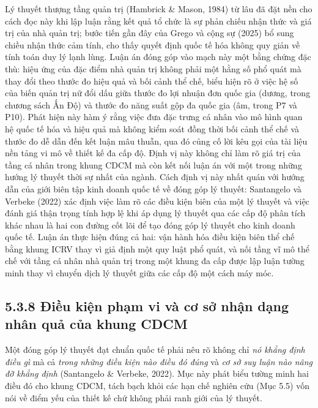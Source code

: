 \documentclass[
  a4paper,
  13pt]{extreport}
\begin{document}
Lý thuyết thượng tầng quản trị (Hambrick \& Mason, 1984) từ lâu đã đặt
nền cho cách đọc này khi lập luận rằng kết quả tổ chức là sự phản chiếu
nhận thức và giá trị của nhà quản trị; bước tiến gần đây của Grego và
cộng sự (2025) bổ sung chiều nhận thức cảm tính, cho thấy quyết định
quốc tế hóa không quy giản về tính toán duy lý lạnh lùng. Luận án đóng
góp vào mạch này một bằng chứng đặc thù: hiệu ứng của đặc điểm nhà quản
trị không phải một hằng số phổ quát mà thay đổi theo thước đo hiệu quả
và bối cảnh thể chế, biểu hiện rõ ở việc hệ số của biến quản trị nữ đổi
dấu giữa thước đo lợi nhuận đơn quốc gia (dương, trong chương sách Ấn
Độ) và thước đo năng suất gộp đa quốc gia (âm, trong P7 và P10). Phát
hiện này hàm ý rằng việc đưa đặc trưng cá nhân vào mô hình quan hệ quốc
tế hóa và hiệu quả mà không kiểm soát đồng thời bối cảnh thể chế và
thước đo dễ dẫn đến kết luận mâu thuẫn, qua đó củng cố lời kêu gọi của
tài liệu nền tảng vi mô về thiết kế đa cấp độ. Định vị này không chỉ làm
rõ giá trị của tầng cá nhân trong khung CDCM mà còn kết nối luận án với
một trong những hướng lý thuyết thời sự nhất của ngành. Cách định vị này
nhất quán với hướng dẫn của giới biên tập kinh doanh quốc tế về đóng góp
lý thuyết: Santangelo và Verbeke (2022) xác định việc làm rõ các điều
kiện biên của một lý thuyết và việc đánh giá thận trọng tính hợp lệ khi
áp dụng lý thuyết qua các cấp độ phân tích khác nhau là hai con đường
cốt lõi để tạo đóng góp lý thuyết cho kinh doanh quốc tế. Luận án thực
hiện đúng cả hai: vận hành hóa điều kiện biên thể chế bằng khung ICRV
thay vì giả định một quy luật phổ quát, và nối tầng vĩ mô thể chế với
tầng cá nhân nhà quản trị trong một khung đa cấp được lập luận tường
minh thay vì chuyển dịch lý thuyết giữa các cấp độ một cách máy móc.

\hypertarget{ux111iux1ec1u-kiux1ec7n-phux1ea1m-vi-vuxe0-cux1a1-sux1edf-nhux1eadn-dux1ea1ng-nhuxe2n-quux1ea3-cux1ee7a-khung-cdcm}{%
\subsection{5.3.8 Điều kiện phạm vi và cơ sở nhận dạng nhân quả của
khung
CDCM}\label{ux111iux1ec1u-kiux1ec7n-phux1ea1m-vi-vuxe0-cux1a1-sux1edf-nhux1eadn-dux1ea1ng-nhuxe2n-quux1ea3-cux1ee7a-khung-cdcm}}

Một đóng góp lý thuyết đạt chuẩn quốc tế phải nêu rõ không chỉ \emph{nó
khẳng định điều gì} mà cả \emph{trong những điều kiện nào điều đó đúng}
và \emph{cơ sở suy luận nào nâng đỡ khẳng định} (Santangelo \& Verbeke,
2022). Mục này phát biểu tường minh hai điều đó cho khung CDCM, tách
bạch khỏi các hạn chế nghiên cứu (Mục 5.5) vốn nói về điểm yếu của thiết
kế chứ không phải ranh giới của lý thuyết.
\end{document}
